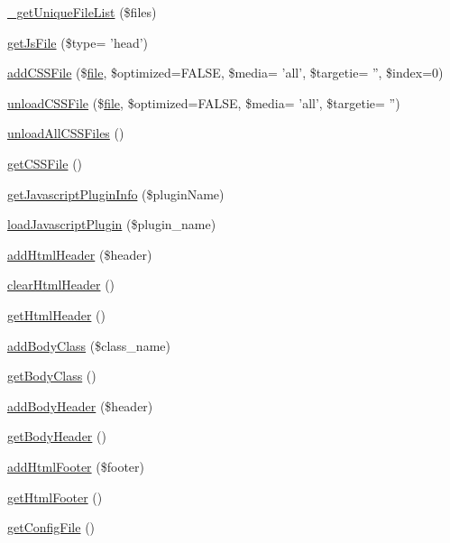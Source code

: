 \begin{DoxyCompactItemize}
\hyperlink{classContext_a8bde0f7d77424555f9b856664b59e0bc}{\-\_\-get\-Unique\-File\-List} (\$files)
\item 
\hyperlink{classContext_aa3844fdfe0768191c5cef3aef8db1115}{get\-Js\-File} (\$type= 'head')
\item 
\hyperlink{classContext_ac024e3744d631bf487ded23c2c6c7e24}{add\-C\-S\-S\-File} (\$\hyperlink{classfile}{file}, \$optimized=F\-A\-L\-S\-E, \$media= 'all', \$targetie= '', \$index=0)
\item 
\hyperlink{classContext_aa8ef9bdf406752ca2f6a9746e239eb4e}{unload\-C\-S\-S\-File} (\$\hyperlink{classfile}{file}, \$optimized=F\-A\-L\-S\-E, \$media= 'all', \$targetie= '')
\item 
\hyperlink{classContext_a9eb05677aeb2e95029a10919ffc6053f}{unload\-All\-C\-S\-S\-Files} ()
\item 
\hyperlink{classContext_a1b14cb135e24cc9c79414a50575cf309}{get\-C\-S\-S\-File} ()
\item 
\hyperlink{classContext_abf616bb3259e090c6e85b3aa1b581b60}{get\-Javascript\-Plugin\-Info} (\$plugin\-Name)
\item 
\hyperlink{classContext_acaea76bdc1334df9c2f088103d619593}{load\-Javascript\-Plugin} (\$plugin\-\_\-name)
\item 
\hyperlink{classContext_a26a1aea944ae54bb826500f544a67950}{add\-Html\-Header} (\$header)
\item 
\hyperlink{classContext_a5f0332b30b4ad65c0374ebd848c1dd98}{clear\-Html\-Header} ()
\item 
\hyperlink{classContext_a302e4b5d868e7a5c8bee216f774ca244}{get\-Html\-Header} ()
\item 
\hyperlink{classContext_ad266c6556167746e9368c4b1a7f6b16b}{add\-Body\-Class} (\$class\-\_\-name)
\item 
\hyperlink{classContext_a6562a2a894b2142362640e512bcf4e09}{get\-Body\-Class} ()
\item 
\hyperlink{classContext_ae7c9dad9ccd3e410283e21c67f395114}{add\-Body\-Header} (\$header)
\item 
\hyperlink{classContext_a991c9fc6985b78d817b6771092913975}{get\-Body\-Header} ()
\item 
\hyperlink{classContext_aa81925b1cc7e991c1c798e739fe048a4}{add\-Html\-Footer} (\$footer)
\item 
\hyperlink{classContext_ae7bb6879f84366eea76da3a7bf6a40bd}{get\-Html\-Footer} ()
\item 
\hyperlink{classContext_a7ac0928e07cfc7f19f9a7341c50b4811}{get\-Config\-File} ()
\item 

\end{DoxyCompactItemize}
